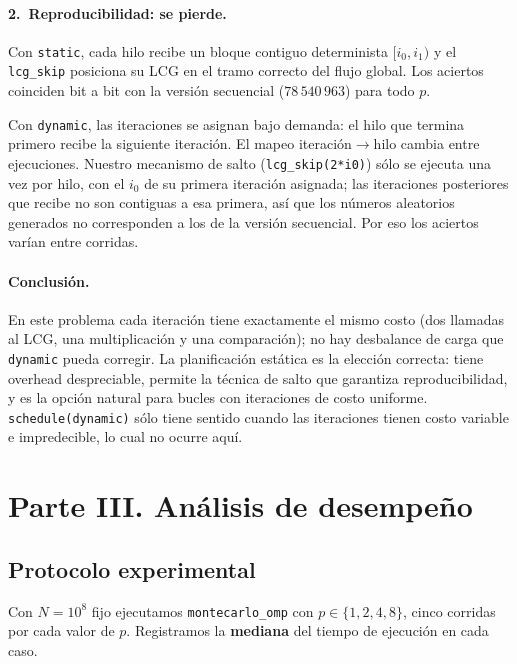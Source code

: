 \documentclass[12pt,a4paper]{article}
\begin{document}
\paragraph{2.\ Reproducibilidad: se pierde.}
Con \texttt{static}, cada hilo recibe un bloque contiguo determinista $[i_0, i_1)$ y el \texttt{lcg\_skip} posiciona su LCG en el tramo correcto del flujo global. Los aciertos coinciden bit a bit con la versi\'on secuencial ($78\,540\,963$) para todo $p$.

Con \texttt{dynamic}, las iteraciones se asignan bajo demanda: el hilo que termina primero recibe la siguiente iteraci\'on. El mapeo iteraci\'on$\to$hilo cambia entre ejecuciones. Nuestro mecanismo de salto (\texttt{lcg\_skip(2*i0)}) s\'olo se ejecuta una vez por hilo, con el $i_0$ de su primera iteraci\'on asignada; las iteraciones posteriores que recibe no son contiguas a esa primera, as\'i que los n\'umeros aleatorios generados no corresponden a los de la versi\'on secuencial. Por eso los aciertos var\'ian entre corridas.

\paragraph{Conclusi\'on.}
En este problema cada iteraci\'on tiene exactamente el mismo costo (dos llamadas al LCG, una multiplicaci\'on y una comparaci\'on); no hay desbalance de carga que \texttt{dynamic} pueda corregir. La planificaci\'on est\'atica es la elecci\'on correcta: tiene overhead despreciable, permite la t\'ecnica de salto que garantiza reproducibilidad, y es la opci\'on natural para bucles con iteraciones de costo uniforme. \texttt{schedule(dynamic)} s\'olo tiene sentido cuando las iteraciones tienen costo variable e impredecible, lo cual no ocurre aqu\'i.

\section*{Parte III. An\'alisis de desempe\~no}

\subsection*{Protocolo experimental}

Con $N=10^8$ fijo ejecutamos \texttt{montecarlo\_omp} con $p\in\{1,2,4,8\}$, cinco corridas por
cada valor de $p$. Registramos la \textbf{mediana} del tiempo de ejecuci\'on en cada caso.
\end{document}
